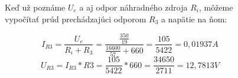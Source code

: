 \begin{figure}[!ht]
\begin{center}
    Keď už poznáme $U_e$ a aj odpor náhradného zdroja $R_i$, môžeme vypočítať prúd prechádzajúci odporom $R_3$ a napätie na ňom:
    
    \[
        I_{R3} = \frac{U_e}{R_i + R_3} = 
        \frac{\frac{350}{19}}{\frac{16600}{57} + 660} = 
        \frac{105}{5422} = 0,01937 A
    \]
    \[
        U_{R3} = I_{R3} * R3 = 
        \frac{105}{5422} * 660 = 
        \frac{34650}{2711} = 12,7813 V
    \]
\end{center}
\end{figure} 